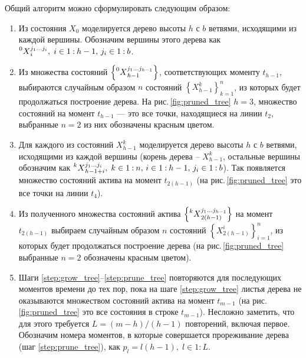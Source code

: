 Общий алгоритм можно сформулировать следующим образом:

\begin{enumerate}[noitemsep]
	\item Из состояния $X_0$ моделируется дерево высоты $h$ с $b$ ветвями, исходящими из каждой вершины. Обозначим вершины этого дерева как $\prescript{0}{}{X}_i^{j_1\dots j_i},\; i\in{1\mathbin{:}{h-1}},\,j_i\in{1\mathbin{:}b}$.
	\item Из 
	множества состояний $\left\{\prescript{0}{}{X}_{h-1}^{j_1\dots j_{h-1}}\right\}$, соответствующих моменту $t_{h-1}$, выбираются случайным образом $n$ состояний $\left\{X_{h-1}^k\right\}_{k=1}^n$, из которых будет продолжаться построение дерева. На рис.\,\ref{fig:pruned_tree} $h=3$, множество состояний на момент $t_{h-1}$ --- это все точки, находящиеся на линии $t_2$, выбранные $n=2$ из них обозначены красным цветом.
	
	\item\label{step:grow_tree} Для каждого из состояний $X_{h-1}^k$ моделируется дерево высоты $h$ с $b$ ветвями, исходящими из каждой вершины (корень дерева -- $X_{h-1}^k$, остальные вершины обозначим как $\prescript{k}{}{X}_{h-1+i}^{j_1\dots j_i},\; k\in{1\mathbin{:}n},\,i\in{1\mathbin{:}{h-1}},\,j_i\in{1\mathbin{:}b}$). Так появляется множество состояний актива на момент $t_{2(h-1)}$ (на рис.\,\ref{fig:pruned_tree} это все точки на линии $t_4$).
	
	\item\label{step:prune_tree} Из полученного множества состояний актива $\left\{\prescript{k}{}{X}_{2(h-1)}^{j_1\dots j_{h-1}}\right\}$ на момент $t_{2(h-1)}$ выбираем случайным образом $n$ состояний $\left\{X_{2(h-1)}^i\right\}_{i=1}^n$, из которых будет продолжаться построение дерева (на рис.\,\ref{fig:pruned_tree} выбранные $n=2$ обозначены красным цветом).
	
	\item Шаги \ref{step:grow_tree}--\ref{step:prune_tree} повторяются для последующих моментов времени до тех пор, пока на шаге \ref{step:grow_tree} листья дерева не оказываются множеством состояний актива на момент $t_{m-1}$ (на рис.\,\ref{fig:pruned_tree} это все состояния в строке $t_{m-1}$). Несложно заметить, что для этого требуется $L = (m-h) / (h-1)$ повторений, включая первое. Обозначим номера моментов, в которые совершается прореживание дерева (шаг \ref{step:prune_tree}), как $p_l = l(h-1),\;l\in{1\mathbin{:}L}$.


\end{enumerate}
